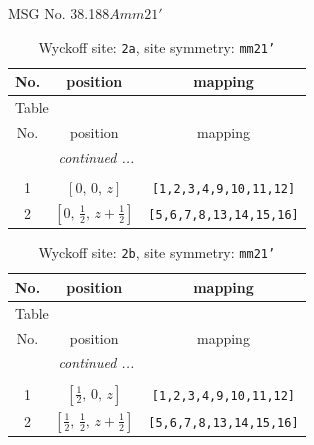\documentclass[fleqn,8pt]{jsarticle}
\begin{document}
\setcounter{MaxMatrixCols}{32}

\renewcommand{\tablename}{Table~}
\renewcommand{\figurename}{Figure~}
\begin{center}
\LARGE
MSG No. 38.188\quad$Amm21'$
\end{center}
\renewcommand{\arraystretch}{1.2}
\begin{longtable}{ccc}
\caption{Wyckoff site: {\tt 2a}, site symmetry: {\tt mm21'}}
 \\
 \hline \hline
No. & position & mapping \\ \hline \endfirsthead

\multicolumn{2}{l}{\tablename\ \thetable{}} \\
 \hline \hline
No. & position & mapping \\ \hline \endhead

 \hline \hline
\multicolumn{2}{r}{\footnotesize\it continued ...} \\ \endfoot

 \hline \hline
\multicolumn{2}{r}{} \\ \endlastfoot

1 & $\left[ 0,\, 0,\, z \right]$ & {\tt [1,2,3,4,9,10,11,12]} \\ \hline
2 & $\left[ 0,\, \frac{1}{2},\, z + \frac{1}{2} \right]$ & {\tt [5,6,7,8,13,14,15,16]} \\
\end{longtable}
\renewcommand{\arraystretch}{1.2}
\begin{longtable}{ccc}
\caption{Wyckoff site: {\tt 2b}, site symmetry: {\tt mm21'}}
 \\
 \hline \hline
No. & position & mapping \\ \hline \endfirsthead

\multicolumn{2}{l}{\tablename\ \thetable{}} \\
 \hline \hline
No. & position & mapping \\ \hline \endhead

 \hline \hline
\multicolumn{2}{r}{\footnotesize\it continued ...} \\ \endfoot

 \hline \hline
\multicolumn{2}{r}{} \\ \endlastfoot

1 & $\left[ \frac{1}{2},\, 0,\, z \right]$ & {\tt [1,2,3,4,9,10,11,12]} \\ \hline
2 & $\left[ \frac{1}{2},\, \frac{1}{2},\, z + \frac{1}{2} \right]$ & {\tt [5,6,7,8,13,14,15,16]} \\
\end{longtable}
\end{document}
